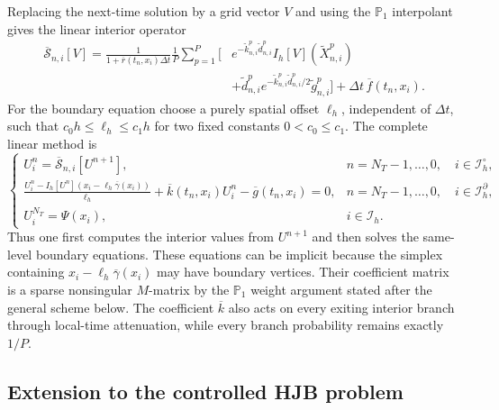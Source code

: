 \documentclass[11pt]{article}
\theoremstyle{definition}
\theoremstyle{remark}
\newcommand{\cS}{\mathcal{S}}
\newcommand{\dt}{\Delta t}
\begin{document}
	Replacing the next-time solution by a grid vector $V$ and using the $\mathbb P_1$ interpolant gives the linear interior operator
	\begin{equation}
		\begin{aligned}
			\overline{\cS}_{n,i}[V]
			=\frac{1}{1+\overline r(t_n,x_i)\dt}\frac1P\sum_{p=1}^P
			\Big[&e^{-\widetilde k_{n,i}^p\widetilde d_{n,i}^p}
			I_h[V](\widetilde X_{n,i}^p)\\
			&+\widetilde d_{n,i}^p
			e^{-\widetilde k_{n,i}^p\widetilde d_{n,i}^p/2}
			\widetilde g_{n,i}^p\Big]
			+\dt\,\overline f(t_n,x_i).
		\end{aligned}
		\label{eq:linear-scheme}
	\end{equation}
	For the boundary equation choose a purely spatial offset $\ell_h$, independent
	of $\dt$, such that $c_0h\le\ell_h\le c_1h$ for two fixed constants
	$0<c_0\le c_1$.  The complete linear method is
	\begin{equation}
		\begin{cases}
			U_i^n=\overline{\cS}_{n,i}[U^{n+1}],
			&n=N_T-1,\ldots,0,\quad i\in\mathcal I_h^\circ,\\[6pt]
			\displaystyle
			\frac{U_i^n-I_h[U^n](x_i-\ell_h\overline\gamma(x_i))}{\ell_h}
			+\overline k(t_n,x_i)U_i^n-\overline g(t_n,x_i)=0,
			&n=N_T-1,\ldots,0,\quad i\in\mathcal I_h^\partial,\\[9pt]
			U_i^{N_T}=\Psi(x_i),&i\in\mathcal I_h .
		\end{cases}
		\label{eq:complete-linear-scheme}
	\end{equation}
	Thus one first computes the interior values from $U^{n+1}$ and then solves
	the same-level boundary equations.  These equations can be implicit because
	the simplex containing $x_i-\ell_h\overline\gamma(x_i)$ may have boundary
	vertices.  Their coefficient matrix is a sparse nonsingular $M$-matrix by
	the $\mathbb P_1$ weight argument stated after the general scheme below.
	The coefficient $\overline k$ also acts on every exiting interior branch
	through local-time attenuation, while every branch probability remains
	exactly $1/P$.
	\subsection{Extension to the controlled HJB problem}
	
\end{document}
